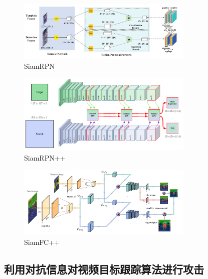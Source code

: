 \begin{figure}
\centering
\includegraphics[width=0.75\textwidth]{Img/related/SiamRPN.png}
\caption{SiamRPN}
\end{figure}

\begin{figure}
\centering
\includegraphics[width=0.75\textwidth]{Img/related/SiamRPN++.png}
\caption{SiamRPN++}
\end{figure}

\begin{figure}
\centering
\includegraphics[width=0.75\textwidth]{Img/related/SiamFC++.png}
\caption{SiamFC++}
\end{figure}

\subsection{利用对抗信息对视频目标跟踪算法进行攻击}
